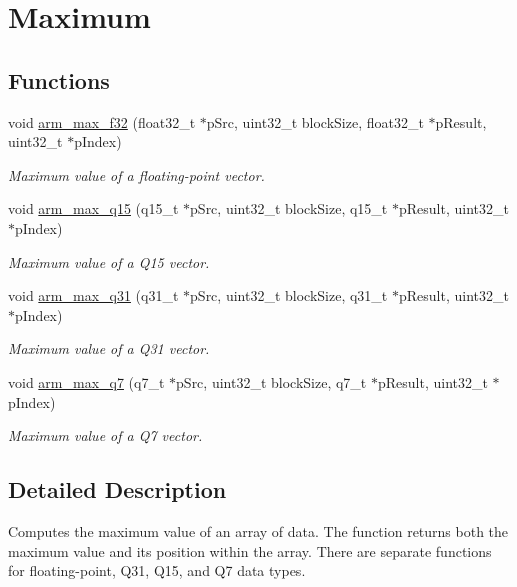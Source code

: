 \hypertarget{group__Max}{}\section{Maximum}
\label{group__Max}
\subsection*{Functions}
\begin{DoxyCompactItemize}
\item 
void \hyperlink{group__Max_ga5b89d1b04575aeec494f678695fb87d8}{arm\+\_\+max\+\_\+f32} (float32\+\_\+t $\ast$p\+Src, uint32\+\_\+t block\+Size, float32\+\_\+t $\ast$p\+Result, uint32\+\_\+t $\ast$p\+Index)
\begin{DoxyCompactList}\small\item\em Maximum value of a floating-\/point vector. \end{DoxyCompactList}\item 
void \hyperlink{group__Max_gac132856c68f4bf2a056eaad5921c7880}{arm\+\_\+max\+\_\+q15} (q15\+\_\+t $\ast$p\+Src, uint32\+\_\+t block\+Size, q15\+\_\+t $\ast$p\+Result, uint32\+\_\+t $\ast$p\+Index)
\begin{DoxyCompactList}\small\item\em Maximum value of a Q15 vector. \end{DoxyCompactList}\item 
void \hyperlink{group__Max_gaff7cbd4e955382def06724cc4cc85795}{arm\+\_\+max\+\_\+q31} (q31\+\_\+t $\ast$p\+Src, uint32\+\_\+t block\+Size, q31\+\_\+t $\ast$p\+Result, uint32\+\_\+t $\ast$p\+Index)
\begin{DoxyCompactList}\small\item\em Maximum value of a Q31 vector. \end{DoxyCompactList}\item 
void \hyperlink{group__Max_ga6afd64d381b5c232de59163ebfe71e35}{arm\+\_\+max\+\_\+q7} (q7\+\_\+t $\ast$p\+Src, uint32\+\_\+t block\+Size, q7\+\_\+t $\ast$p\+Result, uint32\+\_\+t $\ast$p\+Index)
\begin{DoxyCompactList}\small\item\em Maximum value of a Q7 vector. \end{DoxyCompactList}\end{DoxyCompactItemize}


\subsection{Detailed Description}
Computes the maximum value of an array of data. The function returns both the maximum value and its position within the array. There are separate functions for floating-\/point, Q31, Q15, and Q7 data types. 

